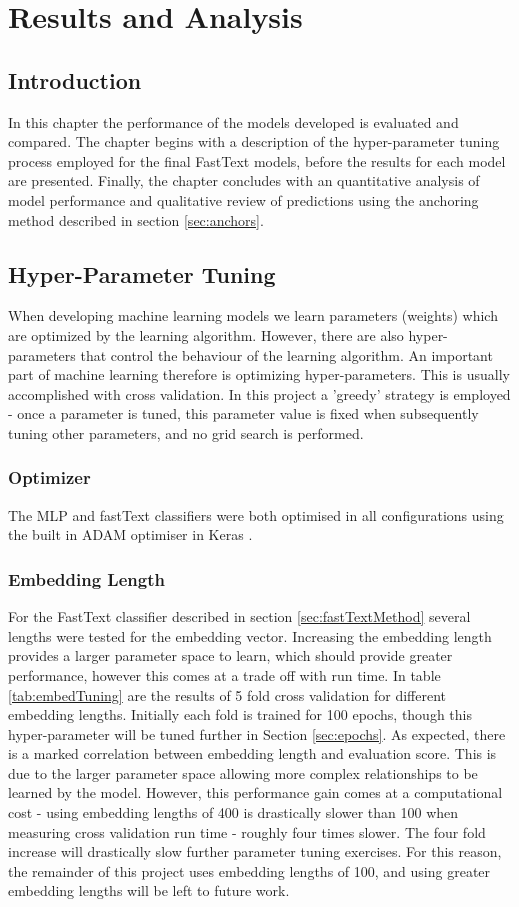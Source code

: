 \documentclass[Dissertation.tex]{subfiles}
\begin{document}
\chapter{Results and Analysis}
\section{Introduction}
In this chapter the performance of the models developed is evaluated and compared. The chapter begins with a description of the hyper-parameter tuning process employed for the final FastText models, before the results for each model are presented. Finally, the chapter concludes with an quantitative analysis of model performance and qualitative review of predictions using the anchoring method described in section \ref{sec:anchors}.

\section{Hyper-Parameter Tuning} \label{sec:hypParams}
When developing machine learning models we learn parameters (weights) which are optimized by the learning algorithm. However, there are also hyper-parameters that control the behaviour of the learning algorithm. An important part of machine learning therefore is optimizing hyper-parameters. This is usually accomplished with cross validation. In this project a 'greedy' strategy is employed - once a parameter is tuned, this parameter value is fixed when subsequently tuning other parameters, and no grid search is performed.

\subsection{Optimizer}
The MLP and fastText classifiers were both optimised in all configurations using the built in ADAM optimiser in Keras \cite{kingmaAdamMethodStochastic2014}.

\subsection{Embedding Length}
For the FastText classifier described in section \ref{sec:fastTextMethod} several lengths were tested for the embedding vector. Increasing the embedding length provides a larger parameter space to learn, which should provide greater performance, however this comes at a trade off with run time. In table \ref{tab:embedTuning} are the results of 5 fold cross validation for different embedding lengths. Initially each fold is trained for 100 epochs, though this hyper-parameter will be tuned further in Section \ref{sec:epochs}. As expected, there is a marked correlation between embedding length and evaluation score. This is due to the larger parameter space allowing more complex relationships to be learned by the model. However, this performance gain comes at a computational cost - using embedding lengths of 400 is drastically slower than 100 when measuring cross validation run time - roughly four times slower. The four fold increase will drastically slow further parameter tuning exercises. For this reason, the remainder of this project uses embedding lengths of 100, and using greater embedding lengths will be left to future work.
\end{document}
